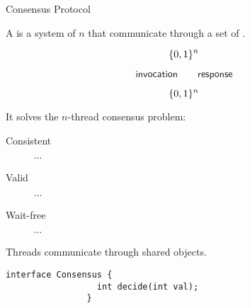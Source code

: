 \begin{frame}{}
  \centerline{\LARGE Consensus Protocol}

  \vspace{0.50cm}
\end{frame}

\begin{frame}{}
  \begin{definition}
    A  is a system of $n$ 
    that communicate through a set of .

    \begin{description}[Communicate]
      \item[Propose]
	\[
	  \{0,1\}^{n}
	\]
      \item[Communicate] 
	\[
	  \textsf{invocation} \qquad \textsf{response}
	\]
      \item[Decide] 
	\[
	  \{0,1\}^{n}
	\]
    \end{description}

    \pause
    \vspace{0.30cm}
    It  solves the $n$-thread consensus problem:
    \begin{description}
      \item[Consistent] $\cdots$
      \item[Valid] $\cdots$
      \item[Wait-free] $\cdots$
    \end{description}
  \end{definition}
\end{frame}

\begin{frame}{}
  \centerline{Threads communicate through shared objects.}
\end{frame}

\begin{frame}[fragile]{}

  \begin{lstlisting}[style = CStyle]
                interface Consensus {
                  int decide(int val);
                }
  \end{lstlisting}
\end{frame}

